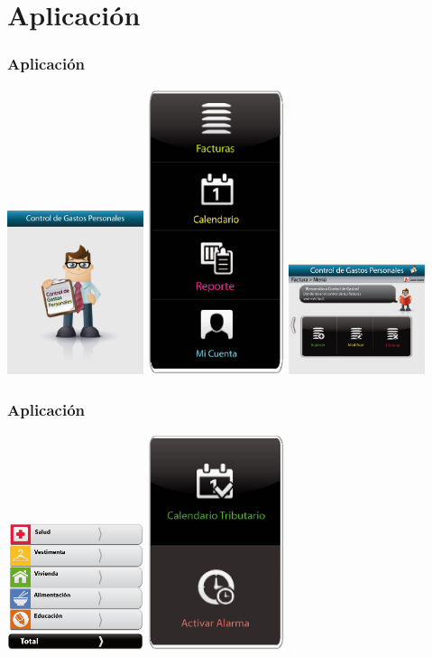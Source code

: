\documentclass[utf8]{beamer}
\begin{document}
\section{Aplicación}  
\begin{frame}[allowframbreaks]
\frametitle{Aplicación}
\begin{center}
\includegraphics[width=0.3\textwidth]{cargando.png}
\includegraphics[width=0.3\textwidth]{menuprincipal.png}
\includegraphics[width=0.3\textwidth]{factura.png}
\end{center}
\end{frame}

\begin{frame}[allowframbreaks]
\frametitle{Aplicación}
\begin{center}
\includegraphics[width=0.3\textwidth]{informe_gastos.png}
\includegraphics[width=0.3\textwidth]{alarma_over.png}
\end{center}
\end{frame}
\end{document}
